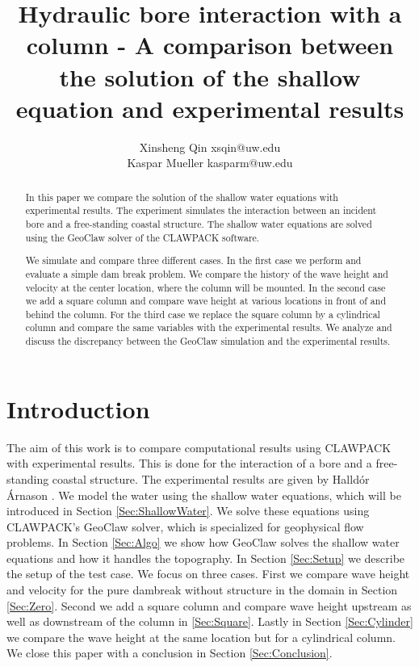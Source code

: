 \documentclass[11pt]{article}
\title{Hydraulic bore interaction with a column - A comparison between the solution of the shallow equation and experimental results}
\author{Xinsheng Qin xsqin@uw.edu\\
        Kaspar Mueller kasparm@uw.edu}
\begin{document}
\maketitle

\begin{abstract}
In this paper we compare the solution of the shallow water equations with experimental results. The experiment simulates the interaction between an incident bore and a free-standing coastal structure. The shallow water equations are solved using the GeoClaw solver of the CLAWPACK software.
\par
We simulate and compare three different cases. In the first case we perform and evaluate a simple dam break problem.
We compare the history of the wave height and velocity at the center location, where the column will be mounted. 
In the second case we add a square column and compare wave height at various locations in front of and behind the column. 
For the third case we replace the square column by a cylindrical column and compare the same variables with the experimental results. 
We analyze and discuss the discrepancy between the GeoClaw simulation and the experimental results.
\end{abstract}

\section{Introduction}\label{Sec:intro}
The aim of this work is to compare computational results using CLAWPACK with experimental results. This is done for the interaction of a bore and a free-standing coastal structure. The experimental results are given by Halld\'or \'Arnason \cite{HA}. We model the water using the shallow water equations, which will be introduced in Section \ref{Sec:ShallowWater}. We solve these equations using CLAWPACK's GeoClaw solver, which is specialized for geophysical flow problems. In Section \ref{Sec:Algo} we show how GeoClaw solves the shallow water equations and how it handles the topography. In Section \ref{Sec:Setup} we describe the setup of the test case. We focus on three cases. First we compare wave height and velocity for the pure dambreak without structure in the domain in Section \ref{Sec:Zero}. Second we add a square column and compare wave height upstream as well as downstream of the column in \ref{Sec:Square}. Lastly in Section \ref{Sec:Cylinder} we compare the wave height at the same location but for a cylindrical column. We close this paper with a conclusion in Section \ref{Sec:Conclusion}.
\end{document}
